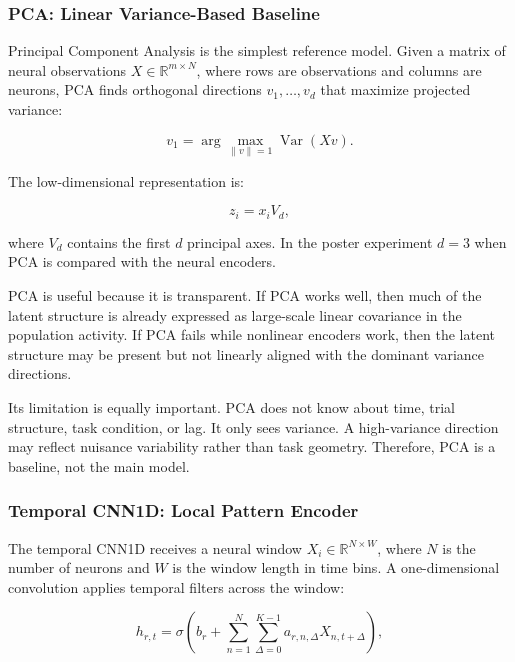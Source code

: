 \documentclass[11pt]{article}
\begin{document}
\subsubsection{PCA: Linear Variance-Based Baseline}

Principal Component Analysis is the simplest reference model. Given a matrix of
neural observations $X \in \mathbb{R}^{m \times N}$, where rows are observations
and columns are neurons, PCA finds orthogonal directions $v_1,\ldots,v_d$ that
maximize projected variance:

\begin{equation}
v_1 =
\arg\max_{\|v\|=1}
\operatorname{Var}(Xv).
\end{equation}

The low-dimensional representation is:

\begin{equation}
z_i = x_i V_d,
\end{equation}

where $V_d$ contains the first $d$ principal axes. In the poster experiment
$d=3$ when PCA is compared with the neural encoders.

PCA is useful because it is transparent. If PCA works well, then much of the
latent structure is already expressed as large-scale linear covariance in the
population activity. If PCA fails while nonlinear encoders work, then the
latent structure may be present but not linearly aligned with the dominant
variance directions.

Its limitation is equally important. PCA does not know about time, trial
structure, task condition, or lag. It only sees variance. A high-variance
direction may reflect nuisance variability rather than task geometry.
Therefore, PCA is a baseline, not the main model.

\subsubsection{Temporal CNN1D: Local Pattern Encoder}

The temporal CNN1D receives a neural window
$X_i \in \mathbb{R}^{N \times W}$, where $N$ is the number of neurons and $W$
is the window length in time bins. A one-dimensional convolution applies
temporal filters across the window:

\begin{equation}
h_{r,t}
=
\sigma
\left(
b_r +
\sum_{n=1}^{N}
\sum_{\Delta=0}^{K-1}
a_{r,n,\Delta}
X_{n,t+\Delta}
\right),
\end{equation}
\end{document}
